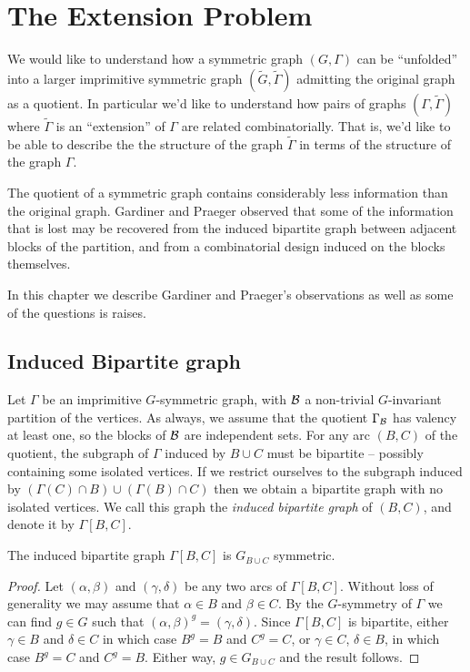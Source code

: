 \chapter{The Extension Problem}

We would like to understand
how a symmetric graph $(G, \Gamma)$ can be ``unfolded''
into a larger imprimitive symmetric graph $(\widetilde{G}, \widetilde{\Gamma})$
admitting the original graph as a quotient.
In particular we'd like to understand how pairs of graphs
$(\Gamma, \widetilde{\Gamma})$ where $\widetilde{\Gamma}$
is an ``extension'' of $\Gamma$ are related combinatorially.
That is, we'd like to be able to describe the the structure
of the graph $\widetilde{\Gamma}$
in terms of the structure of the graph $\Gamma$.

The quotient of a symmetric graph contains considerably less information
than the original graph.
Gardiner and Praeger \cite{GPL1993} observed that
some of the information that is lost
may be recovered from the induced bipartite graph 
between adjacent blocks of the partition,
and from a combinatorial design induced on the blocks themselves.

In this chapter we describe Gardiner and Praeger's observations
as well as some of the questions is raises.

\section{Induced Bipartite graph}


Let $\Gamma$ be an imprimitive $G$-symmetric graph,
with $\mathcal{B}$ a non-trivial $G$-invariant partition of the vertices.
As always, we assume that the quotient $\Gamma_{\mathcal{B}}$ has valency at least one,
so the blocks of $\mathcal{B}$ are independent sets.
For any arc $(B,C)$ of the quotient,
the subgraph of $\Gamma$ induced by $B \cup C$ must be bipartite --
possibly containing some isolated vertices.
If we restrict ourselves to the subgraph induced by
$(\Gamma(C) \cap B) \cup (\Gamma(B) \cap C)$
then we obtain a bipartite graph with no isolated vertices.
We call this graph the {\it induced bipartite graph} of $(B,C)$,
and denote it by $\Gamma[B,C]$.

\begin{proposition}
The induced bipartite graph $\Gamma[B,C]$ is $G_{B \cup C}$ symmetric.
\begin{proof}
Let $(\alpha,\beta)$ and $(\gamma,\delta)$ be any two arcs of $\Gamma[B,C]$.
Without loss of generality we may assume that $\alpha \in B$ and $\beta \in C$.
By the $G$-symmetry of $\Gamma$ we can find $g \in G$ such that
$(\alpha,\beta)^g = (\gamma,\delta)$.
Since $\Gamma[B,C]$ is bipartite, either $\gamma \in B$ and $\delta \in C$ 
in which case $B^g = B$ and $C^g = C$,
or $\gamma \in C$, $\delta \in B$, in which case $B^g = C$ and $C^g = B$.
Either way, $g \in G_{B \cup C}$ and the result follows.
\end{proof}
\end{proposition}


